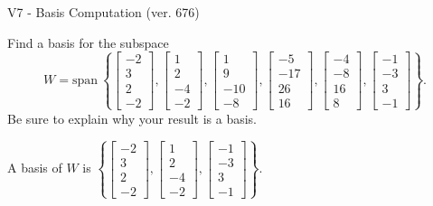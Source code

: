 \begin{exercise}
  \begin{exerciseTitle}V7 - Basis Computation (ver. 676)\end{exerciseTitle}
  \begin{exerciseStatement}
    Find a basis for the subspace 
\[W=\mathrm{span}\ \left\{\left[\begin{array}{r}
-2 \\
3 \\
2 \\
-2
\end{array}\right] , \left[\begin{array}{r}
1 \\
2 \\
-4 \\
-2
\end{array}\right] , \left[\begin{array}{r}
1 \\
9 \\
-10 \\
-8
\end{array}\right] , \left[\begin{array}{r}
-5 \\
-17 \\
26 \\
16
\end{array}\right] , \left[\begin{array}{r}
-4 \\
-8 \\
16 \\
8
\end{array}\right] , \left[\begin{array}{r}
-1 \\
-3 \\
3 \\
-1
\end{array}\right]\right\}.\]
 Be sure to explain why your result is a basis.


  \end{exerciseStatement}
  \begin{exerciseAnswer}
   A basis of \(W\) is  \(\left\{\left[\begin{array}{r}
-2 \\
3 \\
2 \\
-2
\end{array}\right] , \left[\begin{array}{r}
1 \\
2 \\
-4 \\
-2
\end{array}\right] , \left[\begin{array}{r}
-1 \\
-3 \\
3 \\
-1
\end{array}\right]\right\}\).
  


  \end{exerciseAnswer}
\end{exercise}